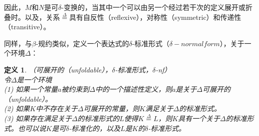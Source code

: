 \documentclass[UTF8]{article}
\newtheorem{thm}{定义}[section]
\begin{document}
		因此，$M$和$N$是可$\delta$-变换的，当其中一个可以由另一个经过若干次的定义展开或折叠时。以及，关系$\stackrel{\Delta}{=}$具有自反性（reflexive），对称性（symmetric）和传递性（transitive）。
		
		同样，与$\beta$-规约类似，定义一个表达式的$\delta$-标准形式（$\delta-normal form$），关于一个环境$\Delta$：
		
		\begin{thm}（可展开的（unfoldable），$\delta$-标准形式，$\delta$-nf）\\
			令$\Delta$是一个环境\\
			(1) 如果一个常量$a$被约束到$\Delta$中的一个描述性定义，则$a$是关于$\Delta$可展开的（unfoldable）。\\
			(2) 如果$K$中不存在关于$\Delta$可展开的常量，则$K$满足关于$\Delta$的标准形式。\\
			(3) 如果存在满足关于$\Delta$的标准形式的$L$使得$K\stackrel{\Delta}{=}L$，则$K$具有一个关于$\Delta$的标准形式。也可以说$K$是可$\delta$-标准化的，以及$L$是$K$的$\delta$-标准形式。
		\end{thm}
\end{document}
